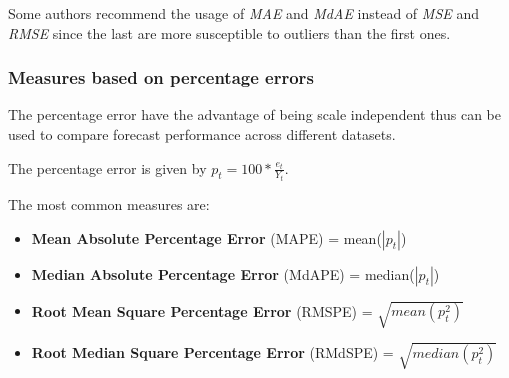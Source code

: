 Some authors \cite{Armstrong:2001fj} recommend the usage of \emph{MAE} and
\emph{MdAE} instead of \emph{MSE} and \emph{RMSE} since the last are more
susceptible to outliers than the first ones.


\subsubsection{Measures based on percentage errors}

The percentage error have the advantage of being scale independent thus can be
used to compare forecast performance across different datasets.

The percentage error is given by \begin{math} p_t = 100 * \frac{e_t}{Y_t}
\end{math}.


The most common measures are:
\begin{itemize}
  \item \textbf{Mean Absolute Percentage Error} (MAPE) = mean(\begin{math}
      \left|p_t\right|\end{math})
    \item \textbf{Median Absolute Percentage Error} (MdAPE) = median(\begin{math}
      \left|p_t\right|\end{math})
    \item \textbf{Root Mean Square Percentage Error} (RMSPE) = \begin{math}\sqrt{mean(
      p_t^2)}\end{math}
    \item \textbf{Root Median Square Percentage Error} (RMdSPE) = \begin{math}\sqrt{median(
      p_t^2)}\end{math}
\end{itemize}


